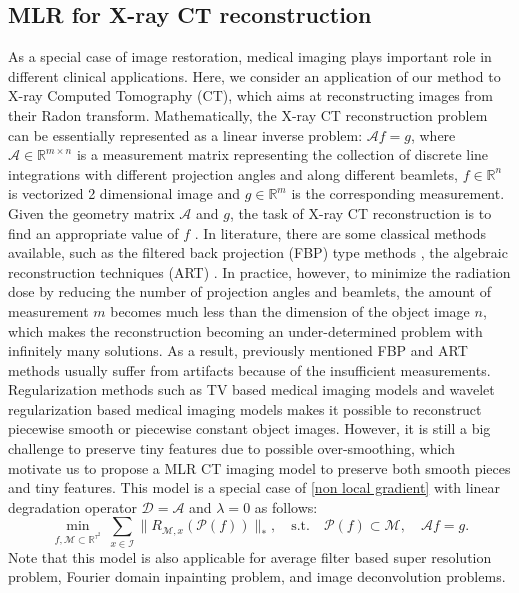 \documentclass[letterpaper,10pt]{article}
\newcommand{\R}{\mathbb{R}}
\def\RR{\mathbb{R}}
\begin{document}
\subsection{MLR for X-ray CT reconstruction}
As a special case of image restoration, medical imaging plays important role in different clinical applications. Here, we consider an application of our method to X-ray Computed Tomography (CT), which aims at reconstructing images from their Radon transform. Mathematically, the X-ray CT reconstruction problem can be essentially represented as a linear inverse problem:
$\mathcal{A}f = g$,
where $\mathcal{A} \in \RR^{m \times n}$ is a measurement matrix representing the collection of discrete line integrations with different projection angles and along different beamlets, $f \in \RR^n$ is vectorized 2 dimensional image and $g \in \RR^m$ is the corresponding measurement. Given the geometry matrix $\mathcal{A}$ and $g$, the task of X-ray CT reconstruction is to find an appropriate value of $f$ \cite{radon1917bestimmung,hsieh2009computed}. In literature, there are some classical methods available, such as the filtered back projection (FBP) type methods \cite{feldkamp1984practical, Defrise1994, Noo1996, Li2006}, the algebraic reconstruction techniques (ART) \cite{gordon1970algebraic}. In practice, however, to minimize the radiation dose by reducing the number of projection angles and beamlets, the amount of measurement $m$ becomes much less than the dimension of the object image $n$, which makes the reconstruction becoming an under-determined problem with infinitely many solutions. As a result, previously mentioned FBP and ART methods usually suffer from artifacts because of the insufficient measurements. Regularization methods such as TV based medical imaging models \cite{TVtomo} and wavelet regularization based medical imaging models \cite{JDLJ2010, DongLiShen2012} makes it possible to reconstruct piecewise smooth or piecewise constant object images. However, it is still a big challenge to preserve tiny features due to possible over-smoothing, which motivate us to propose a MLR CT imaging model to preserve both smooth pieces and tiny features. This model is a special case of \eqref{non local gradient} with linear degradation operator $\mathcal{D} = \mathcal{A}$ and $\lambda = 0$ as follows:
\begin{equation}\label{non local gradient linear}
\min_{f, \mathcal{M} \subset \R^{\tau^2}} ~\sum_{x \in \mathscr{I}}  \| R_{\mathcal{M},x} (\mathcal{P}(f)) \|_* , \quad \text{s.t.}\quad \mathcal{P}(f) \subset \mathcal{M}, \quad \mathcal{A}f = g.
\end{equation}
Note that this model is also applicable for average filter based super resolution problem, Fourier domain inpainting problem, and image deconvolution problems.
\end{document}
